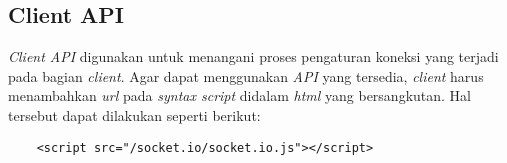\begin{enumerate}
	
\end{enumerate}

\subsection{Client API}
\textit{Client API} digunakan untuk menangani proses pengaturan koneksi yang terjadi pada bagian \textit{client}\cite{rauch:11:socketioclient}. Agar dapat menggunakan \textit{API} yang tersedia, \textit{client} harus menambahkan \textit{url} pada \textit{syntax script} didalam \textit{html} yang bersangkutan. Hal tersebut dapat dilakukan seperti berikut:

\begin{lstlisting}
	<script src="/socket.io/socket.io.js"></script>
\end{lstlisting}

